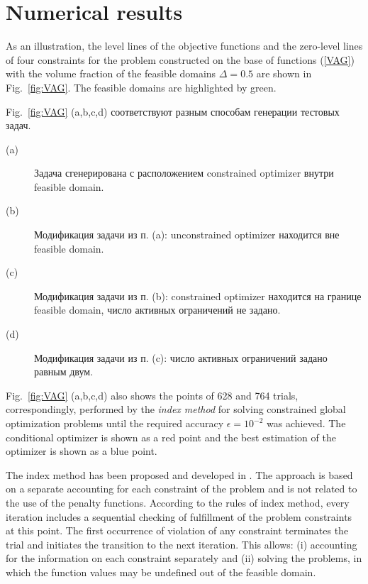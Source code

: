 \documentclass{aip-cp}
\begin{document}
\section{Numerical results}

As an illustration, the level lines of the objective functions and the zero-level lines of four constraints for the problem constructed on the base of functions (\ref{VAG}) with the volume fraction of the feasible domains $\Delta = 0.5$ are shown in Fig.~\ref{fig:VAG}. The feasible domains are highlighted by green. 

Fig.~\ref{fig:VAG} (a,b,c,d) соответствуют разным способам генерации тестовых задач.
\begin{description}
	\item[(a)] Задача сгенерирована с расположением constrained optimizer внутри feasible domain.
	\item[(b)] Модификация задачи из п. (a): unconstrained optimizer находится вне feasible domain.
	\item[(c)] Модификация задачи из п. (b): constrained optimizer находится на границе feasible domain, число активных ограничений не задано.
	\item[(d)] Модификация задачи из п. (c): число активных ограничений задано равным двум.
\end{description}

Fig.~\ref{fig:VAG} (a,b,c,d) also shows the points of 628 and 764 trials, correspondingly, performed by the \textit{index method} for solving constrained global optimization problems until the required accuracy $\epsilon=10^{-2}$ was achieved. The conditional optimizer is shown as a red point and the best estimation of the optimizer is shown as a blue point.

The index method has been proposed and developed in \cite{Strongin2000,Sergeyev2001,Barkalov2002}. The approach is based on a separate accounting for each constraint of the problem and is not related to the use of the penalty functions. According to the rules of index method, every iteration includes a sequential checking of fulfillment of the problem constraints at this point. The first occurrence of violation of any constraint terminates the trial and initiates the transition to the next iteration. This allows: (i) accounting for the information on each constraint separately and (ii) solving the problems, in which the function values may be undefined out of the feasible domain. 
\end{document}

